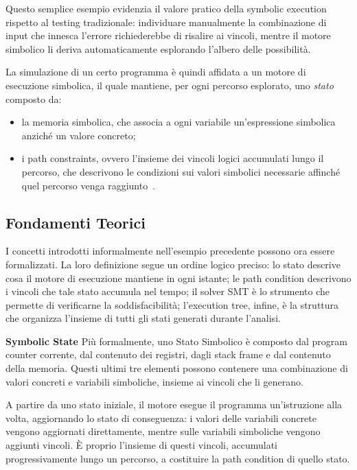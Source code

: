 Questo semplice esempio evidenzia il valore pratico della symbolic execution rispetto al testing tradizionale: individuare manualmente la combinazione di input che innesca l'errore richiederebbe di risalire ai vincoli, mentre il motore simbolico li deriva automaticamente esplorando l'albero delle possibilità.
\newline

La simulazione di un certo programma è quindi affidata a un motore di esecuzione simbolica, il quale mantiene, per ogni percorso esplorato, uno \emph{stato} composto da:
\begin{itemize}
    \item la memoria simbolica, che associa a ogni variabile un'espressione simbolica anziché un valore concreto;
    \item i path constraints, ovvero l'insieme dei vincoli logici accumulati lungo il percorso, che descrivono le condizioni sui valori simbolici necessarie affinché quel percorso venga raggiunto~\cite{Baldoni_sym_ex_survey, Cadar_sym_ex_survey}.
\end{itemize}

\subsection{Fondamenti Teorici}
\label{subsec:fondamenti_teorici}
I concetti introdotti informalmente nell'esempio precedente possono ora essere
formalizzati. La loro definizione segue un ordine logico preciso: lo stato descrive
cosa il motore di esecuzione mantiene in ogni istante; le path condition descrivono
i vincoli che tale stato accumula nel tempo; il solver SMT è lo strumento che
permette di verificarne la soddisfacibilità; l'execution tree, infine, è la struttura
che organizza l'insieme di tutti gli stati generati durante l'analisi.

\textbf{Symbolic State} Più formalmente, uno Stato Simbolico è composto dal
program counter corrente, dal contenuto dei registri, dagli stack frame e dal contenuto
della memoria. Questi ultimi tre elementi possono contenere una combinazione di valori
concreti e variabili simboliche, insieme ai vincoli che li generano.

A partire da uno stato iniziale, il motore esegue il programma un'istruzione alla volta,
aggiornando lo stato di conseguenza: i valori delle variabili concrete vengono aggiornati
direttamente, mentre sulle variabili simboliche vengono aggiunti vincoli. È proprio
l'insieme di questi vincoli, accumulati progressivamente lungo un percorso, a costituire
la path condition di quello stato.

